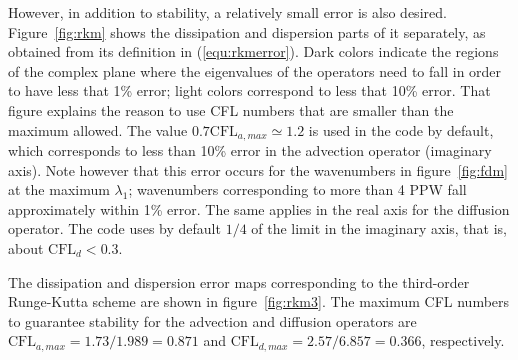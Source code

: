 {However, in addition to stability, a relatively small error is also
desired. Figure~\ref{fig:rkm} shows the dissipation and dispersion parts of it
separately, as obtained from its definition in (\ref{equ:rkmerror}). Dark colors
indicate the regions of the complex plane where the eigenvalues of the operators
need to fall in order to have less that 1\% error; light colors correspond to
less that 10\% error. That figure explains the reason to use CFL numbers that
are smaller than the maximum allowed. The value $0.7\textrm{CFL}_{a,max}\simeq
1.2$ is used in the code by default, which corresponds to less than 10\% error
in the advection operator (imaginary axis). Note however that this error occurs
for the wavenumbers in figure~\ref{fig:fdm} at the maximum $\lambda_1$;
wavenumbers corresponding to more than 4 PPW fall approximately within 1\%
error. The same applies in the real axis for the diffusion operator. The code
uses by default $1/4$ of the limit in the imaginary axis, that is, about
$\textrm{CFL}_{d}<0.3$.

The dissipation and dispersion error maps corresponding to the third-order
Runge-Kutta scheme are shown in figure~\ref{fig:rkm3}. The maximum CFL numbers
to guarantee stability for the advection and diffusion operators are
$\textrm{CFL}_{a,max} = 1.73/1.989=0.871$ and $\textrm{CFL}_{d,max} =
2.57/6.857=0.366$, respectively.

}
